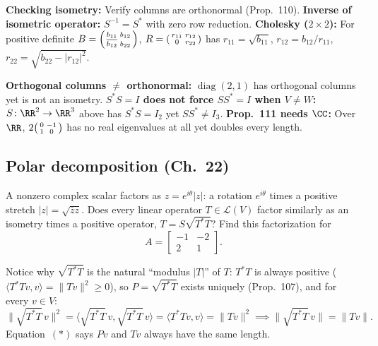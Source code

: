\documentclass[10pt]{scrartcl}
\newcommand{\LL}{\mathcal L}\newcommand{\PP}{\mathcal P}\newcommand{\MM}{\mathcal M}
\begin{document}
\begin{shortcuts}
  \ii \textbf{Checking isometry:} Verify columns are orthonormal (Prop.~110).
  \ii \textbf{Inverse of isometric operator:} $S^{-1}=S^*$ with zero row reduction.
  \ii \textbf{Cholesky ($2\times2$):} For positive definite $B=\begin{psmallmatrix}b_{11}&b_{12}\\\overline{b_{12}}&b_{22}\end{psmallmatrix}$, $R=\begin{psmallmatrix}r_{11}&r_{12}\\0&r_{22}\end{psmallmatrix}$ has $r_{11}=\sqrt{b_{11}}$, $r_{12}=b_{12}/r_{11}$, $r_{22}=\sqrt{b_{22}-|r_{12}|^2}$.
\end{shortcuts}

\begin{trapbox}
  \ii \textbf{Orthogonal columns $\neq$ orthonormal:} $\operatorname{diag}(2,1)$ has orthogonal columns yet is not an isometry.
  \ii \textbf{$S^*S=I$ does not force $SS^*=I$ when $V\neq W$:} $S\colon\RR^2\to\RR^3$ above has $S^*S=I_2$ yet $SS^*\neq I_3$.
  \ii \textbf{Prop.~111 needs $\CC$:} Over $\RR$, $2\begin{psmallmatrix}0&-1\\1&0\end{psmallmatrix}$ has no real eigenvalues at all yet doubles every length.
\end{trapbox}

\subsection{Polar decomposition (Ch.~22)}

\begin{qbox}
  A nonzero complex scalar factors as $z=e^{i\theta}|z|$: a rotation $e^{i\theta}$ times a positive stretch $|z|=\sqrt{\overline{z}z}$. Does every linear operator $T\in\LL(V)$ factor similarly as an isometry times a positive operator, $T=S\sqrt{T^*T}$? Find this factorization for
  \[
    A=\begin{bmatrix}-1&-2\\2&1\end{bmatrix}.
  \]
\end{qbox}

Notice why $\sqrt{T^*T}$ is the natural ``modulus $|T|$'' of $T$: $T^*T$ is always positive ($\langle T^*Tv,v\rangle=\|Tv\|^2\ge0$), so $P=\sqrt{T^*T}$ exists uniquely (Prop.~107), and for every $v\in V$:
\begin{equation*}\tag{$\ast$}
  \|\sqrt{T^*T}\,v\|^2 = \langle\sqrt{T^*T}\,v,\sqrt{T^*T}\,v\rangle = \langle T^*Tv,v\rangle = \|Tv\|^2
  \implies \|\sqrt{T^*T}\,v\| = \|Tv\|.
\end{equation*}
Equation~$(\ast)$ says $Pv$ and $Tv$ always have the same length.
\end{document}
